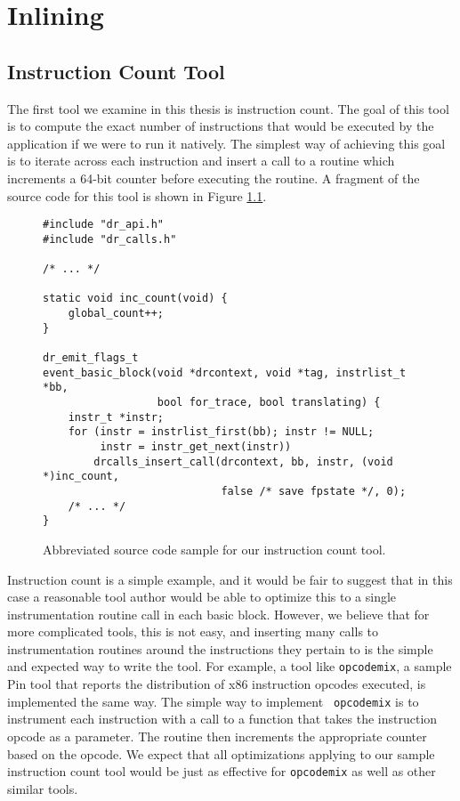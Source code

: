 \chapter{Inlining}
\label{sec:inlining}

\section{Instruction Count Tool}

The first tool we examine in this thesis is instruction count.  The goal of this
tool is to compute the exact number of instructions that would be executed by
the application if we were to run it natively.  The simplest way of achieving
this goal is to iterate across each instruction and insert a call to a routine
which increments a 64-bit counter before executing the routine.  A fragment of
the source code for this tool is shown in Figure \ref{fig:naive_inscount}.

\begin{figure}
\begin{verbatim}
#include "dr_api.h"
#include "dr_calls.h"

/* ... */

static void inc_count(void) {
    global_count++;
}

dr_emit_flags_t
event_basic_block(void *drcontext, void *tag, instrlist_t *bb,
                  bool for_trace, bool translating) {
    instr_t *instr;
    for (instr = instrlist_first(bb); instr != NULL;
         instr = instr_get_next(instr))
        drcalls_insert_call(drcontext, bb, instr, (void *)inc_count,
                            false /* save fpstate */, 0);
    /* ... */
}
\end{verbatim}
\caption{Abbreviated source code sample for our instruction count tool.}
\label{fig:naive_inscount}
\end{figure}

Instruction count is a simple example, and it would be fair to suggest that in
this case a reasonable tool author would be able to optimize this to a single
instrumentation routine call in each basic block.  However, we believe that for
more complicated tools, this is not easy, and inserting many calls to
instrumentation routines around the instructions they pertain to is the simple
and expected way to write the tool.  For example, a tool like {\tt opcodemix},
a sample Pin tool that reports the distribution of x86 instruction opcodes
executed, is implemented the same way.  The simple way to implement {\tt
opcodemix} is to instrument each instruction with a call to a function that
takes the instruction opcode as a parameter.  The routine then increments the
appropriate counter based on the opcode.  We expect that all optimizations
applying to our sample instruction count tool would be just as effective for
{\tt opcodemix} as well as other similar tools.

